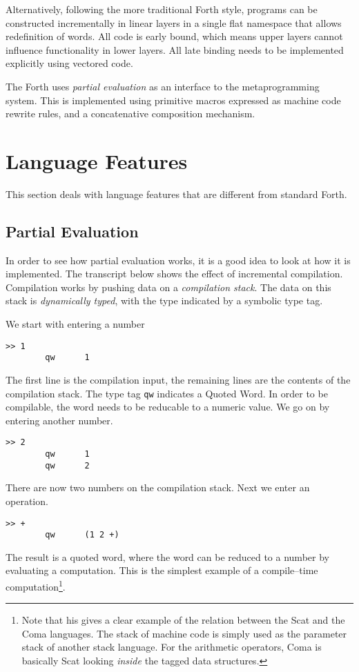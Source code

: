 \documentclass[12pt]{article}
\begin{document}
Alternatively, following the more traditional Forth style, programs
can be constructed incrementally in linear layers in a single flat
namespace that allows redefinition of words. All code is early bound,
which means upper layers cannot influence functionality in lower
layers. All late binding needs to be implemented explicitly using
vectored code.

The Forth uses \emph{partial evaluation} as an interface to the
metaprogramming system. This is implemented using primitive macros
expressed as machine code rewrite rules, and a concatenative
composition mechanism.

\section{Language Features}

This section deals with language features that are different from
standard Forth.

\subsection{Partial Evaluation}

In order to see how partial evaluation works, it is a good idea to
look at how it is implemented. The transcript below shows the effect
of incremental compilation. Compilation works by pushing data on a
\emph{compilation stack}. The data on this stack is \emph{dynamically
  typed}, with the type indicated by a symbolic type tag.

We start with entering a number
\begin{verbatim}
>> 1
        qw      1
\end{verbatim}
The first line is the compilation input, the remaining lines are the
contents of the compilation stack. The type tag \verb|qw| indicates a
Quoted Word. In order to be compilable, the word needs to be reducable
to a numeric value. We go on by entering another number.
\begin{verbatim}
>> 2
        qw      1
        qw      2
\end{verbatim}
There are now two numbers on the compilation stack. Next we enter an
operation.
\begin{verbatim}
>> +
        qw      (1 2 +)
\end{verbatim}
The result is a quoted word, where the word can be reduced to a number
by evaluating a computation. This is the simplest example of a
compile--time computation\footnote{Note that his gives a clear example
  of the relation between the Scat and the Coma languages. The stack
  of machine code is simply used as the parameter stack of another
  stack language. For the arithmetic operators, Coma is basically Scat
  looking \emph{inside} the tagged data structures.}.
\end{document}
